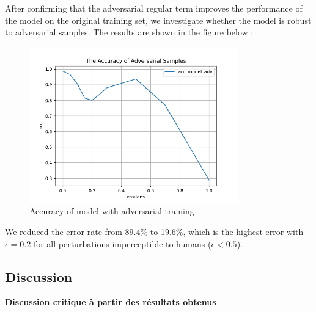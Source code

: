 \newpage
After confirming that the adversarial regular term improves the performance of the model on the original training set, we investigate whether the model is robust to adversarial samples. The results are shown in the figure below :

\begin{figure}[htbp]
\centering
\includegraphics[width=9cm]{acc_advtraining_2.png}
\caption{Accuracy of model with adversarial training}
\end{figure}
We reduced the error rate from 89.4$\%$ to 19.6$\%$, which is the highest error with $\epsilon = 0.2$ for all perturbations imperceptible to humans ($\epsilon < 0.5$).
\subsection{Discussion}

\textbf{Discussion critique à partir des
résultats obtenus} \\



